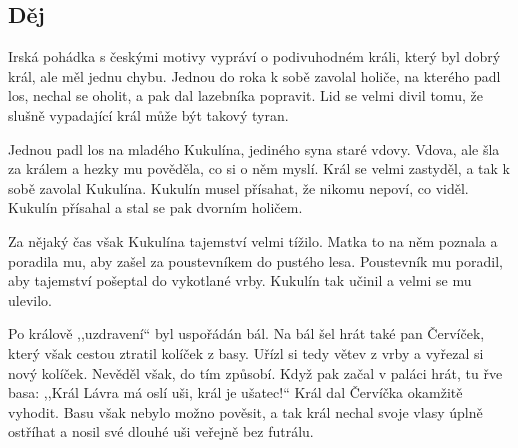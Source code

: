 \subsection*{Děj}
Irská pohádka s českými motivy vypráví o podivuhodném králi, který byl dobrý král, ale měl jednu chybu.
Jednou do roka k sobě zavolal holiče, na kterého padl los, nechal se oholit, a pak dal lazebníka popravit.
Lid se velmi divil tomu, že slušně vypadající král může být takový tyran.

Jednou padl los na mladého Kukulína, jediného syna staré vdovy.
Vdova, ale šla za králem a hezky mu pověděla, co si o něm myslí.
Král se velmi zastyděl, a tak k sobě zavolal Kukulína.
Kukulín musel přísahat, že nikomu nepoví, co viděl.
Kukulín přísahal a stal se pak dvorním holičem.

Za nějaký čas však Kukulína tajemství velmi tížilo.
Matka to na něm poznala a poradila mu, aby zašel za poustevníkem do pustého lesa.
Poustevník mu poradil, aby tajemství pošeptal do vykotlané vrby.
Kukulín tak učinil a velmi se mu ulevilo.

Po králově ,,uzdravení“ byl uspořádán bál.
Na bál šel hrát také pan Červíček, který však cestou ztratil kolíček z basy.
Uřízl si tedy větev z vrby a vyřezal si nový kolíček.
Nevěděl však, do tím způsobí.
Když pak začal v paláci hrát, tu řve basa: ,,Král Lávra má oslí uši, král je ušatec!“
Král dal Červíčka okamžitě vyhodit.
Basu však nebylo možno pověsit, a tak král nechal svoje vlasy úplně ostříhat a nosil své dlouhé uši veřejně bez futrálu.
